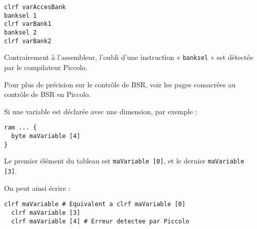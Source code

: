 \begin{lstlisting}[language=piccolo]
clrf varAccesBank
banksel 1
clrf varBank1
banksel 2
clrf varBank2
\end{lstlisting}

Contrairement à l'assembleur, l'oubli d'une instruction « \texttt{banksel} » est détectée par le compilateur Piccolo.

Pour plus de précision sur le contrôle de BSR, voir les pages consacrées au contrôle de BSR en Piccolo.

Si une variable est déclarée avec une dimension, par exemple :
\begin{lstlisting}[language=piccolo]
ram ... { 
  byte maVariable [4]
}
\end{lstlisting}

Le premier élément du tableau est \texttt{maVariable [0]}, et le dernier  \texttt{maVariable [3]}.

On peut ainsi écrire :
\begin{lstlisting}[language=piccolo]
  clrf maVariable # Equivalent a clrf maVariable [0]
  clrf maVariable [3]
  clrf maVariable [4] # Erreur detectee par Piccolo
\end{lstlisting}


